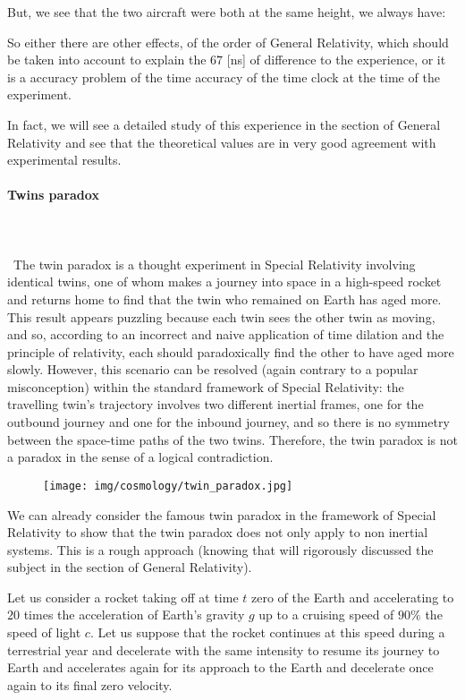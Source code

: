 	But, we see that the two aircraft were both at the same height, we always have:
	
	So either there are other effects, of the order of General Relativity, which should be taken into account to explain the $67$ [ns] of difference to the experience, or it is a accuracy problem of the time accuracy of the time clock at the time of the experiment.

	In fact, we will see a detailed study of this experience in the section of General Relativity and see that the theoretical values are in very good agreement with experimental results.
	
	\paragraph{Twins paradox}\mbox{}\\\\\
	The twin paradox is a thought experiment in Special Relativity involving identical twins, one of whom makes a journey into space in a high-speed rocket and returns home to find that the twin who remained on Earth has aged more. This result appears puzzling because each twin sees the other twin as moving, and so, according to an incorrect and naive application of time dilation and the principle of relativity, each should paradoxically find the other to have aged more slowly. However, this scenario can be resolved (again contrary to a popular misconception) within the standard framework of Special Relativity: the travelling twin's trajectory involves two different inertial frames, one for the outbound journey and one for the inbound journey, and so there is no symmetry between the space-time paths of the two twins. Therefore, the twin paradox is not a paradox in the sense of a logical contradiction.
	\begin{figure}[H]
		\centering
		\texttt{[image: img/cosmology/twin\_paradox.jpg]}
	\end{figure}
	We can already consider the famous twin paradox in the framework of Special Relativity to show that the twin paradox does not only apply to non inertial systems. This is a rough approach (knowing that will rigorously discussed the subject in the section of General Relativity).

	Let us consider a rocket taking off at time $t$ zero of the Earth and accelerating to $20$ times the acceleration of Earth's gravity $g$ up to a cruising speed of $90\%$ the speed of light $c$. Let us suppose that the rocket continues at this speed during a terrestrial year and decelerate with the same intensity to resume its journey to Earth and accelerates again for its approach to the Earth and decelerate once again to its final zero velocity.
	
